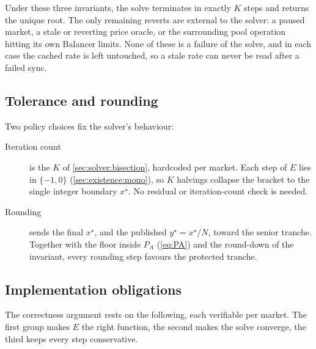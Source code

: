 Under these three invariants, the solve terminates in exactly $K$ steps
and returns the unique root. The only remaining reverts are external to
the solver: a paused market, a stale or reverting price oracle, or the
surrounding pool operation hitting its own Balancer limits. None of these
is a failure of the solve, and in each case the cached rate is left
untouched, so a stale rate can never be read after a failed sync.

\subsection{Tolerance and rounding}
\label{sec:solver:rounding}

Two policy choices fix the solver's behaviour:
\begin{description}
  \item[Iteration count] is the $K$ of \cref{sec:solver:bisection},
    hardcoded per market. Each step of $E$ lies in $\{-1, 0\}$
    (\cref{sec:existence:mono}), so $K$ halvings collapse the bracket to
    the single integer boundary $x^\star$. No residual or
    iteration-count check is needed.
  \item[Rounding] sends the final $x^\star$, and the published
    $y^\star = x^\star/N$, toward the senior tranche. Together with the
    floor inside $P_A$ (\cref{eq:PA}) and the round-down of the
    invariant, every rounding step favours the protected tranche.
\end{description}

\subsection{Implementation obligations}
\label{sec:solver:obligations}

The correctness argument rests on the following, each verifiable per
market. The first group makes $E$ the right function, the second makes
the solve converge, the third keeps every step conservative.

